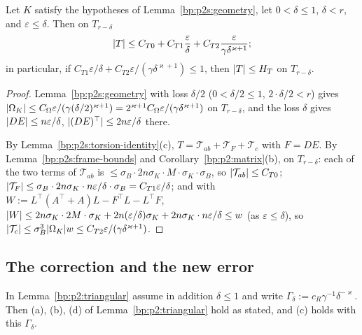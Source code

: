 \begin{lemma}\label{bp:p2s:torsion-bound}
Let $K$ satisfy the hypotheses of Lemma~\ref{bp:p2s:geometry}, let $0<\delta\le1$, $\delta<r$, and $\varepsilon\le\delta$. Then
on $T_{r-\delta}$
\[
\lvert T\rvert\le C_{T0}+C_{T1}\frac\varepsilon\delta+C_{T2}\frac\varepsilon{\gamma\delta^{\varkappa+1}};
\]
in particular, if $C_{T1}\varepsilon/\delta+C_{T2}\varepsilon/(\gamma\delta^{\varkappa+1})\le1$, then $\lvert T\rvert\le H_T$ on $T_{r-\delta}$.
\end{lemma}

\begin{proof}
\label{step:p2s:tb-om}
Lemma~\ref{bp:p2s:geometry} with loss $\delta/2$ ($0<\delta/2\le1$, $2\cdot\delta/2<r$) gives
$\lvert \Omega_K\rvert\le C_\Omega\varepsilon/(\gamma(\delta/2)^{\varkappa+1})=2^{\varkappa+1}C_\Omega\varepsilon/(\gamma\delta^{\varkappa+1})$ on $T_{r-\delta}$, and
the loss $\delta$ gives $\lvert DE\rvert\le n\varepsilon/\delta$, $\lvert (DE)^\top\rvert\le2n\varepsilon/\delta$ there.

\label{step:p2s:tb-parts}
By Lemma~\ref{bp:p2s:torsion-identity}(c), $T=\mathcal T_{ab}+\mathcal T_F+\mathcal T_c$ with $F=DE$. By
Lemma~\ref{bp:p2s:frame-bounds} and Corollary~\ref{bp:p2:matrix}(b), on $T_{r-\delta}$: each of the two terms of
$\mathcal T_{ab}$ is $\le\sigma_B\cdot2n\sigma_K\cdot M\cdot\sigma_K\cdot\sigma_B$, so $\lvert \mathcal T_{ab}\rvert\le C_{T0}$;
$\lvert \mathcal T_F\rvert\le\sigma_B\cdot2n\sigma_K\cdot n\varepsilon/\delta\cdot\sigma_B=C_{T1}\varepsilon/\delta$; and with
$W:=L^\top(A^\top+A)L-F^\top L-L^\top F$,
$\lvert W\rvert\le2n\sigma_K\cdot2M\cdot\sigma_K+2n(\varepsilon/\delta)\sigma_K+2n\sigma_K\cdot n\varepsilon/\delta\le w$ (as $\varepsilon\le\delta$),
so $\lvert \mathcal T_c\rvert\le\sigma_B^3\lvert \Omega_K\rvert w\le C_{T2}\varepsilon/(\gamma\delta^{\varkappa+1})$.
\end{proof}

\subsection{The correction and the new error}\label{bp:p2s:sec-correction}

\begin{corollary}\label{bp:p2s:triangular}
In Lemma~\ref{bp:p2:triangular} assume in addition $\delta\le1$ and write $\Gamma_\delta:=c_R\gamma^{-1}\delta^{-\varkappa}$. Then
(a), (b), (d) of Lemma~\ref{bp:p2:triangular} hold as stated, and (c) holds with this $\Gamma_\delta$.
\end{corollary}

